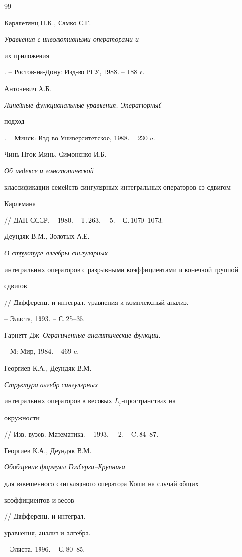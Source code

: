 \begin{thebibliography}{99}







Карапетянц Н.К., Самко С.Г. {\em Уравнения с инволютивными операторами и


их приложения}. -- Ростов-на-Дону: Изд-во РГУ, 1988. -- 188 c.




Антоневич А.Б. {\em Линейные функциональные уравнения. Операторный


подход}. -- Минск: Изд-во Университетское, 1988. -- 230 c.




Чинь Нгок Минь, Симоненко И.Б. {\em Об индексе и гомотопической


классификации семейств сингулярных интегральных операторов со сдвигом


Карлемана} // ДАН СССР. -- 1980. -- Т.\,263. -- \No\,5. -- С.\,1070--1073.




Деундяк В.М., Золотых А.Е. {\em О структуре алгебры сингулярных


интегральных операторов с разрывными коэффициентами и конечной группой


сдвигов} // Дифференц. и интеграл. уравнения и комплексный анализ.


-- Элиста, 1993. -- С.\,25--35.




Гарнетт Дж. {\em Ограниченные аналитические функции}.


-- М: Мир, 1984. -- 469 c.




Георгиев К.А., Деундяк В.М. {\em Структура алгебр сингулярных


интегральных операторов в весовых $L_p$-пространствах на


окружности} // Изв. вузов. Математика. -- 1993. -- \No\,2. -- C.\,84--87.




Георгиев К.А., Деундяк В.М. {\em Обобщение формулы Гохберга--Крупника


для взвешенного сингулярного оператора Коши на случай общих


коэффициентов и весов} // Дифференц. и интеграл.


уравнения, анализ и алгебра.


-- Элиста, 1996. -- С.\,80--85.



\end{thebibliography}
